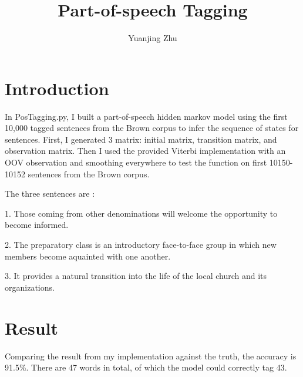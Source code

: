 \documentclass{article}
\title{Part-of-speech Tagging}
\author{Yuanjing Zhu}
\begin{document}
\maketitle

\section{Introduction}

In PosTagging.py, I built a part-of-speech hidden markov model using the first 10,000 tagged sentences from the Brown corpus to infer the sequence of states
for sentences. First, I generated 3 matrix: initial matrix, transition matrix, and observation matrix. Then I used the provided Viterbi implementation with an OOV observation and smoothing everywhere to test the function on first 10150-10152 sentences from the Brown corpus. 

The three sentences are :

1. Those coming from other denominations will welcome the opportunity to become informed.

2. The preparatory class is an introductory face-to-face group in which new members become aquainted with one another.

3. It provides a natural transition into the life of the local church and its organizations.


\section{Result}

Comparing the result from my implementation against the truth, the accuracy is 91.5\%. There are 47 words in total, of which the model could correctly tag 43. 
\newline
\end{document}
